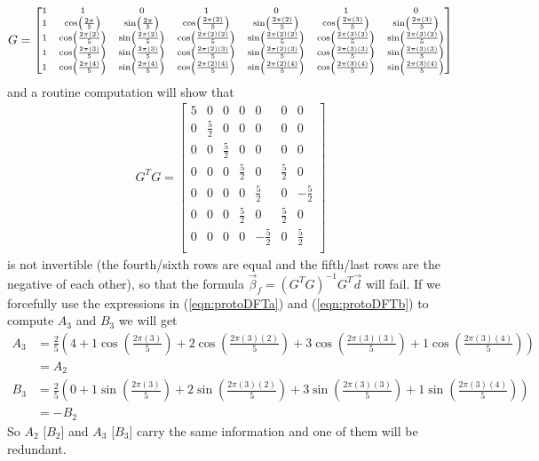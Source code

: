 {\begin{align*}
\scriptsize
G = 
\begin{bmatrix}
1 & 1 & 0 & 1 & 0 & 1 & 0 \\
1 & \cos(\frac{2\pi}{5}) & \sin(\frac{2\pi}{5}) & \cos(\frac{2\pi(2)}{5}) & \sin(\frac{2\pi(2)}{5}) & \cos(\frac{2\pi(3)}{5}) & \sin(\frac{2\pi(3)}{5})\\
1 & \cos(\frac{2\pi(2)}{5}) & \sin(\frac{2\pi(2)}{5}) & \cos(\frac{2\pi(2)(2)}{5}) & \sin(\frac{2\pi(2)(2)}{5}) & \cos(\frac{2\pi(3)(2)}{5}) & \sin(\frac{2\pi(3)(2)}{5}) \\
1 & \cos(\frac{2\pi(3)}{5}) & \sin(\frac{2\pi(3)}{5}) & \cos(\frac{2\pi(2)(3)}{5}) & \sin(\frac{2\pi(2)(3)}{5}) & \cos(\frac{2\pi(3)(3)}{5}) & \sin(\frac{2\pi(3)(3)}{5})\\
1 & \cos(\frac{2\pi(4)}{5}) & \sin(\frac{2\pi(4)}{5}) & \cos(\frac{2\pi(2)(4)}{5}) & \sin(\frac{2\pi(2)(4)}{5}) & \cos(\frac{2\pi(3)(4)}{5}) & \sin(\frac{2\pi(3)(4)}{5})
\end{bmatrix}    
\end{align*}
\vspace{\maxdimen}
and a routine computation will show that
\begin{align*}
G^T G = 
\begin{bmatrix}
5 & 0 & 0 & 0 & 0 & 0 & 0 \\
0 & \frac{5}{2} & 0 & 0 & 0 & 0 & 0 \\
0 & 0 & \frac{5}{2} & 0 & 0 & 0 & 0 \\
0 & 0 & 0 & \frac{5}{2} & 0 & \frac{5}{2} & 0 \\
0 & 0 & 0 & 0 & \frac{5}{2} & 0 & -\frac{5}{2} \\
0 & 0 & 0 & \frac{5}{2} & 0 & \frac{5}{2} & 0 \\
0 & 0 & 0 & 0 & -\frac{5}{2} & 0 & \frac{5}{2} \\
\end{bmatrix}
\end{align*}
is not invertible (the fourth/sixth rows are equal and the fifth/last rows are the negative of each other), so that the formula $\vec{\beta}_f = (G^TG)^{-1}G^T\vec{d}$ will fail. If we forcefully use the expressions in (\ref{eqn:protoDFTa}) and (\ref{eqn:protoDFTb}) to compute $A_3$ and $B_3$ we will get
\begin{align*}
A_3 &= \frac{2}{5} \left(4 + 1\cos(\frac{2\pi(3)}{5}) + 2\cos(\frac{2\pi(3)(2)}{5}) + 3\cos(\frac{2\pi(3)(3)}{5}) + 1\cos(\frac{2\pi(3)(4)}{5})\right) \\
&= A_2 \\
B_3 &= \frac{2}{5} \left(0 + 1\sin(\frac{2\pi(3)}{5}) + 2\sin(\frac{2\pi(3)(2)}{5}) + 3\sin(\frac{2\pi(3)(3)}{5}) + 1\sin(\frac{2\pi(3)(4)}{5})\right) \\
&= -B_2    
\end{align*}
So $A_2$ [$B_2$] and $A_3$ [$B_3$] carry the same information and one of them will be redundant.
}

